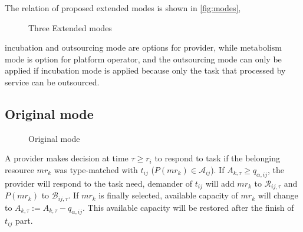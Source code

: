 The relation of proposed extended modes is shown in \autoref{fig:modes},
\begin{figure}[htbp]
    \centering
    \resizebox{\textwidth}{!}{}
    \caption{Three Extended modes}
    \label{fig:modes}
\end{figure}
incubation and outsourcing mode are options for provider, while metabolism mode is option for platform operator, and the outsourcing mode can only be applied if incubation mode is applied because only the task that processed by service can be outsourced.


\subsection{Original mode} %
\label{sub:interactions_and_decisions}

\begin{figure}[htbp]
    \centering
    \resizebox{0.9\textwidth}{!}{}
    \caption{Original mode}
    \label{fig:originmode}
\end{figure}

A provider makes decision at time $\tau\ge r_i$ to respond  to task if the belonging resource $mr_k$ was type-matched with $t_{ij}$ ($P(mr_k)\in\mathcal{A}_{ij}$). If $A_{k,\tau} \ge q_{\alpha,ij}$, the provider will respond to the task need, demander of $t_{ij}$ will add $mr_k$ to $\mathcal{R}_{ij,\tau}$ and $P(mr_k)$ to $\mathcal{B}_{ij,\tau}$. If $mr_k$ is finally selected, available capacity of $mr_k$ will change to $A_{k,\tau} := A_{k,\tau} - q_{\alpha,ij}$. This available capacity will be restored after the finish of $t_{ij}$ part.

